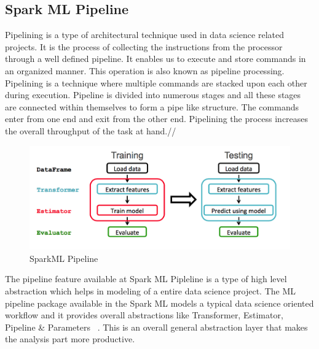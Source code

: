 \begin{enumerate}
\subsection{Spark ML Pipeline}
Pipelining is a type of architectural technique used in data science related projects. 
It is the process of collecting the instructions from the processor through a well defined 
pipeline. It enables us to execute and store commands in an organized manner. This operation is also known as 
pipeline processing. Pipelining is a technique where multiple commands are 
stacked upon each other during execution. Pipeline is divided into numerous stages and all these stages 
are connected within themselves to form a pipe like structure. The commands enter 
from one end and exit from the other end. Pipelining the process increases the overall throughput of the task at hand.//

\begin{figure}[!ht]
\centering\includegraphics[width=\columnwidth]{images/spark_pipeline.png}
\caption{SparkML Pipeline~\cite{hid-sp18-418-spark-pipeline}}
\label{f:Pipeline in SparkML}
\end{figure}

The pipeline feature available at Spark ML Pipleline is a type of high level abstraction which helps 
in modeling of a entire data science project. The ML pipeline package available in the Spark ML models a 
typical data science oriented workflow and it provides overall abstractions like Transformer, Estimator, 
Pipeline & Parameters ~\cite{hid-sp18-418-spark}. This is an overall general abstraction 
layer that makes the analysis part more productive.


\end{enumerate}
